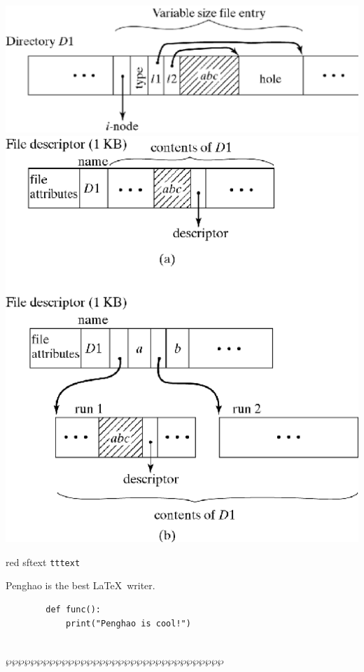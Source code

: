 \documentclass[11pt,a4paper]{article}
\theoremstyle{definition}
\begin{document}
	\begin{minipage}{0.5\linewidth}
		\includegraphics[width=0.8\linewidth ]{m2/implementDirectory}
		\includegraphics[width=0.8\linewidth ]{m2/entryOrganization}
	\end{minipage}
	

	


	
	
	



\newpage

{\color{red} red } \textsf{sftext} \texttt{tttext}
\begin{tcolorbox} 
Penghao is the best \LaTeX \, writer.
\end{tcolorbox}
\begin{tcolorbox}
	\begin{lstlisting}
		def func():
			print("Penghao is cool!")
	\end{lstlisting}
\end{tcolorbox}
\noindent{}\\\noindent$\wp\wp\wp\wp\wp\wp\wp\wp\wp\wp\wp\wp\wp\wp\wp\wp\wp\wp\wp\wp\wp\wp\wp\wp\wp\wp\wp\wp\wp\wp\wp\wp\wp\wp\wp$\\
{}\\
\lipsum[1]
\end{document}
